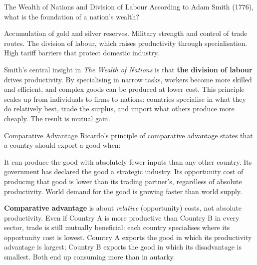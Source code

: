 \documentclass[paper=a5]{scrartcl}
\begin{document}
\begin{question}[type=mc]{The Wealth of Nations and Division of Labour}
According to Adam Smith (1776), what is the foundation of a nation's wealth?
\begin{choices}
  \choice        Accumulation of gold and silver reserves.
  \choice        Military strength and control of trade routes.
  \correctchoice The division of labour, which raises productivity through
                 specialisation.
  \choice        High tariff barriers that protect domestic industry.
\end{choices}
\begin{solution}
  Smith's central insight in \emph{The Wealth of Nations} is that \textbf{the
  division of labour} drives productivity. By specialising in narrow tasks,
  workers become more skilled and efficient, and complex goods can be produced
  at lower cost. This principle scales up from individuals to firms to nations:
  countries specialise in what they do relatively best, trade the surplus, and
  import what others produce more cheaply. The result is mutual gain.
\end{solution}
\end{question}

\begin{question}[type=mc]{Comparative Advantage}
Ricardo's principle of comparative advantage states that a country should
export a good when:
\begin{choices}
  \choice        It can produce the good with absolutely fewer inputs than
                 any other country.
  \choice        Its government has declared the good a strategic industry.
  \correctchoice Its opportunity cost of producing that good is lower than
                 its trading partner's, regardless of absolute productivity.
  \choice        World demand for the good is growing faster than world supply.
\end{choices}
\begin{solution}
  \textbf{Comparative advantage} is about \emph{relative} (opportunity) costs,
  not absolute productivity. Even if Country A is more productive than
  Country B in every sector, trade is still mutually beneficial: each country
  specialises where its opportunity cost is lowest. Country A exports the
  good in which its productivity advantage is largest; Country B exports the
  good in which its disadvantage is smallest. Both end up consuming more than
  in autarky.
\end{solution}
\end{question}
\end{document}
